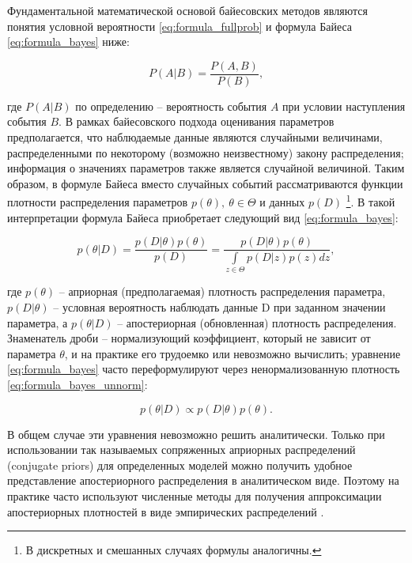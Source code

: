 \documentclass[a4paper,14pt]{extreport}
\begin{document}
\label{section:bayes_methods}

Фундаментальной математической основой байесовских методов являются понятия условной вероятности \eqref{eq:formula_fullprob} и формула Байеса \eqref{eq:formula_bayes} ниже:

\begin{equation}
	P(A|B)=\frac{P(A,B)}{P(B)} ,
	\label{eq:formula_fullprob}
\end{equation}

\noindent
где $P(A|B)$ по определению -- вероятность события $A$ при условии наступления события $B$. В рамках байесовского подхода оценивания параметров предполагается, что наблюдаемые данные являются случайными величинами, распределенными по некоторому (возможно неизвестному) закону распределения; информация о значениях параметров также является случайной величиной. Таким образом, в формуле Байеса вместо случайных событий рассматриваются функции плотности распределения параметров $p(\theta), \: \theta \in \Theta$ и данных $p(D)$ \footnote{В дискретных и смешанных случаях формулы аналогичны. }. В такой интерпретации формула Байеса приобретает следующий вид \eqref{eq:formula_bayes}:

\begin{equation}
	p(\theta|D) = \frac{p(D|\theta) p(\theta)}{p(D)} = \frac{p(D|\theta) p(\theta)}{\int\limits_{z\in\Theta}{p(D|z)p(z)dz}} ,
	\label{eq:formula_bayes}
\end{equation}

\noindent
где $p(\theta)$ -- априорная (предполагаемая) плотность распределения параметра, $p(D|\theta)$ -- условная вероятность наблюдать данные D при заданном значении параметра, а $p(\theta|D)$ -- апостериорная (обновленная) плотность распределения. Знаменатель дроби -- нормализующий коэффициент, который не зависит от параметра $\theta$, и на практике его трудоемко или невозможно вычислить; уравнение \eqref{eq:formula_bayes} часто переформулируют через ненормализованную плотность \eqref{eq:formula_bayes_unnorm}:

\begin{equation}
	p(\theta|D) \propto p(D|\theta) p(\theta) .
	\label{eq:formula_bayes_unnorm}
\end{equation}

В общем случае эти уравнения невозможно решить аналитически. Только при использовании так называемых сопряженных априорных распределений (conjugate priors) для определенных моделей можно получить удобное представление апостериорного распределения в аналитическом виде. Поэтому на практике часто используют численные методы для получения аппроксимации апостериорных плотностей в виде эмпирических распределений \cite{intro_to_pp,stan_user_guide}.
\end{document}
